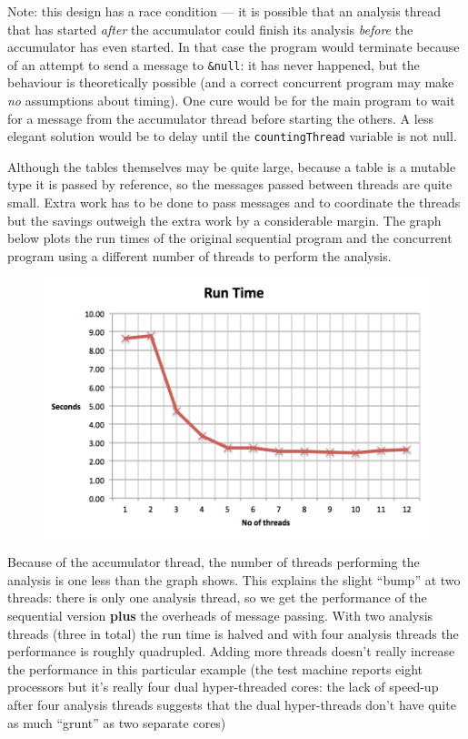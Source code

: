 Note: this design has a race condition --- it is possible that an analysis
thread that has started {\em after} the accumulator could finish its analysis
{\em before} the accumulator has even started. In that case the program would
terminate because of an attempt to send a message to \texttt{\&null}: it has
never happened, but the behaviour is theoretically possible (and a correct
concurrent program may make {\em no} assumptions about timing). One cure would
be for the main program to wait for a message from the accumulator thread before
starting the others. A less elegant solution would be to delay until the
\texttt{countingThread} variable is not null.

Although the tables themselves may be quite large, because a table is a mutable
type it is passed by reference, so the messages passed between threads are quite
small. Extra work has to be done to pass messages and to coordinate the threads
but the savings outweigh the extra work by a considerable margin. The graph
below plots the run times of the original sequential program and the concurrent
program using a different number of threads to perform the analysis.

\begin{figure}[h]
{\includegraphics[scale=0.75]{ub-img/threadPerformance.png}}
\end{figure}

Because of the accumulator thread, the number of threads performing
the analysis is one less than the graph shows. This explains the
slight ``bump'' at two threads: there is only one analysis thread, so
we get the performance of the sequential version {\bf plus} the
overheads of message passing. With two analysis threads (three in
total) the run time is halved and with four analysis threads the
performance is roughly quadrupled. Adding more threads doesn't really
increase the performance in this particular example (the test machine
reports eight processors but it's really four dual hyper-threaded cores: the
lack of speed-up after four analysis threads suggests that the dual
hyper-threads don't have quite as much ``grunt'' as two separate cores)

